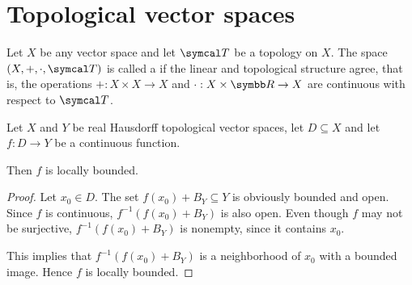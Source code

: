 \section{Topological vector spaces}\label{sec:topological_vector_spaces}

\begin{definition}\label{def:topological_vector_space}
  Let $X$ be any vector space and let $\Cal{T}$ be a topology on $X$. The space $(X, +, \cdot, \Cal{T})$ is called a  if the linear and topological structure agree, that is, the operations $+: X \times X \to X$ and $\cdot: X \times \BB{R} \to X$ are continuous with respect to $\Cal{T}$.
\end{definition}

\begin{proposition}\label{thm:continuous_implies_locally_bounded}
  Let $X$ and $Y$ be real Hausdorff topological vector spaces, let $D \subseteq X$ and let $f: D \to Y$ be a continuous function.

  Then $f$ is locally bounded.
\end{proposition}
\begin{proof}
  Let $x_0 \in D$. The set $f(x_0) + B_Y \subseteq Y$ is obviously bounded and open. Since $f$ is continuous, $f^{-1}(f(x_0) + B_Y)$ is also open. Even though $f$ may not be surjective, $f^{-1}(f(x_0) + B_Y)$ is nonempty, since it contains $x_0$.

  This implies that $f^{-1}(f(x_0) + B_Y)$ is a neighborhood of $x_0$ with a bounded image. Hence $f$ is locally bounded.
\end{proof}
